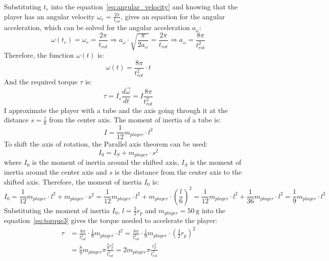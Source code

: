 Substituting $t_e$ into the equation~\ref{eq:angular_velocity} and knowing that the player has an angular velocity $\omega_e=\frac{2\pi}{t_{rot}}$, gives an equation for the angular acceleration, which can be solved for the angular acceleration $a_\omega$:
\begin{equation}
    \label{eq:angular_acceleration}
    \omega(t_e) = \omega_e = \frac{2\pi}{t_{rot}} \Rightarrow a_{\omega} \cdot \sqrt {\frac{\pi}{2a_{\omega}}} = \frac{2\pi}{t_{rot}} \Rightarrow a_{\omega} = \frac{8\pi}{t_{rot}^2}
\end{equation}
Therefore, the function $\omega(t)$ is:
\begin{equation}
    \label{eq:angular_velocity_function}
    \omega(t) = \frac{8\pi}{t_{rot}^2} \cdot t
\end{equation}
And the required torque $\tau$ is:
\begin{equation}
    \label{eq:torque3}
    \tau = I_s \frac{d\vec{\omega}}{dt} = I \frac{8\pi}{t_{rot}^2}
\end{equation}
I approximate the player with a tube and the axis going through it at the distance $s=\frac{l}{6}$ from the center axis.
The moment of inertia of a tube is:
\begin{equation}
    \label{eq:moment_of_inertia}
    I = \frac{1}{12} m_{player} \cdot l^2
\end{equation}
To shift the axis of rotation, the Parallel axis theorem can be used:
\begin{equation}
    \label{eq:parallel_axis_theorem}
    I_0 = I_{S} + m_{player} \cdot s^2
\end{equation}
where $I_0$ is the moment of inertia around the shifted axis, $I_{S}$ is the moment of inertia around the center axis and $s$ is the distance from the center axis to the shifted axis.
Therefore, the moment of inertia $I_0$ is:
\begin{equation}
    \label{eq:moment_of_inertia_shifted}
    I_0 = \frac{1}{12} m_{player} \cdot l^2 + m_{player} \cdot s^2 = \frac{1}{12} m_{player} \cdot l^2 + m_{player} \cdot \left(\frac{l}{6}\right)^2 = \frac{1}{12} m_{player} \cdot l^2 + \frac{1}{36} m_{player} \cdot l^2 = \frac{1}{9} m_{player} \cdot l^2
\end{equation}
Substituting the moment of inertia $I_0$, $l=\frac{3}{2}r_p$ and $m_{player}=\qty[per-mode=symbol]{50}{\g}$ into the equation~\ref{eq:torque3} gives the torque needed to accelerate the player:
\begin{equation}
    \label{eq:torque4}
    \begin{split}
        \tau &= \frac{8\pi}{t_{rot}^2} \cdot \frac{1}{9} m_{player} \cdot l^2 = \frac{8\pi}{t_{rot}^2} \cdot \frac{1}{9} m_{player} \cdot \left(\frac{3}{2}r_p\right)^2\\
        &= \frac{8}{9}m_{player}\pi\frac{\frac{9}{4}r_p^2}{t_{rot}^2}=2m_{player}\pi\frac{r_p^2}{t_{rot}^2}
    \end{split}
\end{equation}
